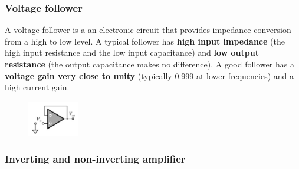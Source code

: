 \subsubsection{Voltage follower}

A voltage follower is a an electronic circuit that provides impedance
conversion from a high to low level. A typical follower has \textbf{high input
impedance} (the high input resistance and the low input capacitance) and \textbf{low output
resistance} (the output capacitance makes no difference). A good follower has a
\textbf{voltage gain very close to unity} (typically 0.999 at lower frequencies) and a high
current gain.

\begin{figure}[H]
    \centering
    \includegraphics[width = 0.2\textwidth]{L4/img/voltage-follower.PNG}
\end{figure}

\subsubsection{Inverting and non-inverting amplifier}

